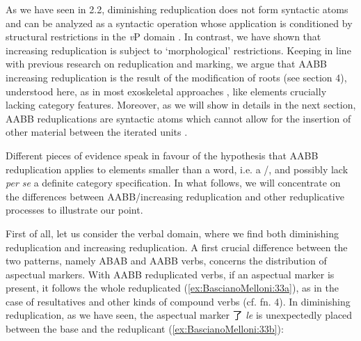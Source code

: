 \documentclass[output=paper]{langsci/langscibook}
\begin{document}
As we have seen in 2.2, diminishing reduplication does not form
syntactic atoms and can be analyzed as a syntactic operation whose
application is conditioned by structural restrictions in the \emph{v}P
domain %
\citep[see][]{ArcodiaBascianoEtAl2014,BascianoMelloni2017}%
%
. In contrast, we have shown that increasing reduplication is
subject to `morphological' restrictions. Keeping in line with previous
research on reduplication and  marking, we argue that AABB
increasing reduplication is the result of the modification of roots (see
section 4), understood here, as in most exoskeletal approaches %
\citep[see][]{Borer2003}%
%
, like elements crucially lacking category features.
Moreover, as we will show in details in the next section, AABB
reduplications are syntactic atoms which cannot allow for the insertion
of other material between the iterated units %
\citep[see e.g.][]{Lapointe1980}%
%
.

Different pieces of evidence speak in favour of the hypothesis that AABB
reduplication applies to elements smaller than a word, i.e. a /,
and possibly lack \emph{per se} a definite category specification. In
what follows, we will concentrate on the differences between
AABB/increasing reduplication and other reduplicative processes to
illustrate our point.

First of all, let us consider the verbal domain, where we find both
diminishing reduplication and increasing reduplication. A first crucial
difference between the two patterns, namely ABAB and AABB verbs,
concerns the distribution of aspectual markers. With AABB reduplicated
verbs, if an aspectual marker is present, it follows the whole
reduplicated  (\ref{ex:BascianoMelloni:33a}), as in the case of resultatives and other kinds
of compound verbs (cf. fn. 4). In diminishing reduplication, as we have
seen, the aspectual marker 了 \emph{le} is unexpectedly placed between
the base and the reduplicant (\ref{ex:BascianoMelloni:33b}):
\end{document}
